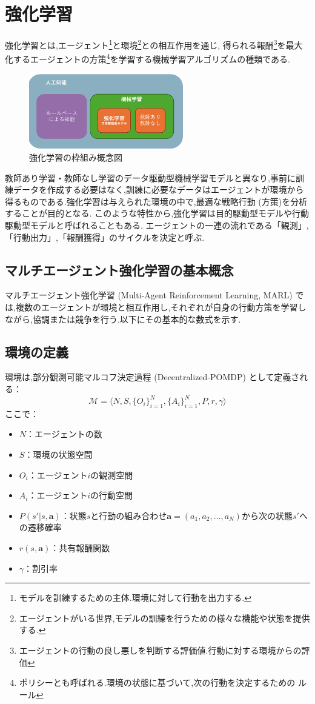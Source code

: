 \section{強化学習}
強化学習とは,エージェント\footnote{モデルを訓練するための主体.環境に対して行動を出力する.}と環境\footnote{エージェントがいる世界,モデルの訓練を行うための様々な機能や状態を提供する.}との相互作用を通じ,
得られる報酬\footnote{エージェントの行動の良し悪しを判断する評価値.行動に対する環境からの評価}を最大化するエージェントの方策\footnote{ポリシーとも呼ばれる.環境の状態に基づいて,次の行動を決定するための
ルール}を学習する機械学習アルゴリズムの種類である.
\begin{figure}[H] 
  \centering 
  \includegraphics[width=0.6\textwidth]{Figures/2024-12-09 202235.png}
  \caption{強化学習の枠組み概念図} 
  \label{fig:01} 
\end{figure}
教師あり学習・教師なし学習のデータ駆動型機械学習モデルと異なり,事前に訓練データを作成する必要はなく,訓練に必要なデータはエージェントが環境から得るものである.強化学習は与えられた環境の中で,最適な戦略行動 (方策)を分析することが目的となる.
このような特性から,強化学習は目的駆動型モデルや行動駆動型モデルと呼ばれることもある.
エージェントの一連の流れである「観測」,「行動出力」,「報酬獲得」のサイクルを決定と呼ぶ.
\subsection{マルチエージェント強化学習の基本概念}

マルチエージェント強化学習 (Multi-Agent Reinforcement Learning, MARL) では,複数のエージェントが環境と相互作用し,それぞれが自身の行動方策を学習しながら,協調または競争を行う.以下にその基本的な数式を示す.

\subsection*{環境の定義}
環境は,部分観測可能マルコフ決定過程 (Decentralized-POMDP) として定義される：
\[
\mathcal{M} = \langle N, S, \{O_i\}_{i=1}^N, \{A_i\}_{i=1}^N, P, r, \gamma \rangle
\]
ここで：
\begin{itemize}
    \item $N$：エージェントの数
    \item $S$：環境の状態空間
    \item $O_i$：エージェント$i$の観測空間
    \item $A_i$：エージェント$i$の行動空間
    \item $P(s' | s, \boldsymbol{a})$：状態$s$と行動の組み合わせ$\boldsymbol{a} = (a_1, a_2, \dots, a_N)$から次の状態$s'$への遷移確率
    \item $r(s, \boldsymbol{a})$：共有報酬関数
    \item $\gamma$：割引率
\end{itemize}

